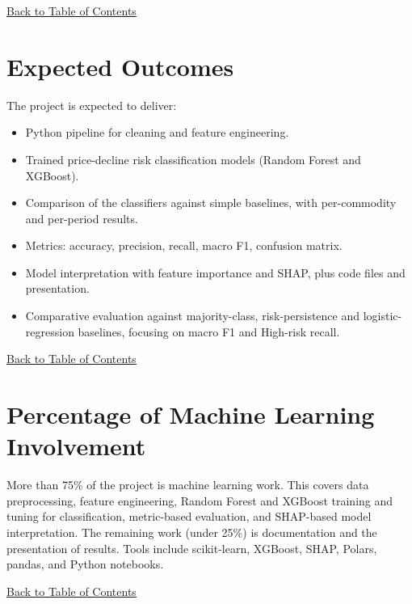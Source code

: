 \documentclass[12pt,a4paper]{article}
\begin{document}
\hyperref[contents]{\small Back to Table of Contents}
\newpage
\section{Expected Outcomes }
The project is expected to deliver:
\begin{itemize}
    \item Python pipeline for cleaning and feature engineering.
    \item Trained price-decline risk classification models (Random Forest and XGBoost).
    \item Comparison of the classifiers against simple baselines, with per-commodity and per-period results.
    \item Metrics: accuracy, precision, recall, macro F1, confusion matrix.
    \item Model interpretation with feature importance and SHAP, plus code files and presentation.
    \item Comparative evaluation against majority-class, risk-persistence and logistic-regression baselines, focusing on macro F1 and High-risk recall.
\end{itemize}

\hyperref[contents]{\small Back to Table of Contents}
\newpage
\section{Percentage of Machine Learning Involvement
}
More than 75\% of the project is machine learning work. This covers data preprocessing, feature engineering, Random Forest and XGBoost training and tuning for classification, metric-based evaluation, and SHAP-based model interpretation. The remaining work (under 25\%) is documentation and the presentation of results. Tools include scikit-learn, XGBoost, SHAP, Polars, pandas, and Python notebooks.


\hyperref[contents]{\small Back to Table of Contents}
\newpage

{}


\end{document}
